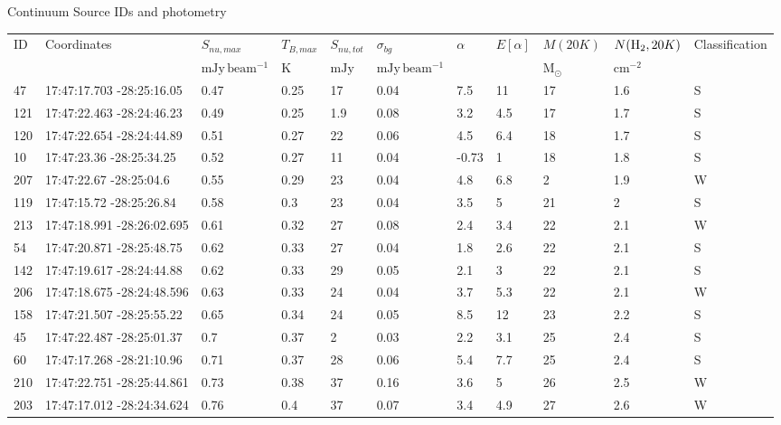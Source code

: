 \begin{deluxetable}[htp]
\caption{Continuum Source IDs and photometry}
\begin{tabular}{lllllllllll}
\label{tab:photometry}
\footnotesize
ID & Coordinates & $S_{nu,max}$ & $T_{B,max}$ & $S_{nu,tot}$ & $\sigma_{bg}$ & $\alpha$ & $E[\alpha]$ & $M(20 K)$ & $N(\textrm{H}_{2},20 K)$ & Classification \\
 &  & $\mathrm{mJy\,beam^{-1}}$ & $\mathrm{K}$ & $\mathrm{mJy}$ & $\mathrm{mJy\,beam^{-1}}$ &  &  & $\mathrm{M_{\odot}}$ & $\mathrm{cm^{-2}}$ &  \\
\hline
47 & 17:47:17.703 -28:25:16.05 & 0.47 & 0.25 & 17 & 0.04 & 7.5 & 11 & 17 & 1.6\ee{24} & S \\
121 & 17:47:22.463 -28:24:46.23 & 0.49 & 0.25 & 1.9 & 0.08 & 3.2 & 4.5 & 17 & 1.7\ee{24} & S \\
120 & 17:47:22.654 -28:24:44.89 & 0.51 & 0.27 & 22 & 0.06 & 4.5 & 6.4 & 18 & 1.7\ee{24} & S \\
10 & 17:47:23.36 -28:25:34.25 & 0.52 & 0.27 & 11 & 0.04 & -0.73 & 1 & 18 & 1.8\ee{24} & S \\
207 & 17:47:22.67 -28:25:04.6 & 0.55 & 0.29 & 23 & 0.04 & 4.8 & 6.8 & 2 & 1.9\ee{24} & W \\
119 & 17:47:15.72 -28:25:26.84 & 0.58 & 0.3 & 23 & 0.04 & 3.5 & 5 & 21 & 2\ee{24} & S \\
213 & 17:47:18.991 -28:26:02.695 & 0.61 & 0.32 & 27 & 0.08 & 2.4 & 3.4 & 22 & 2.1\ee{24} & W \\
54 & 17:47:20.871 -28:25:48.75 & 0.62 & 0.33 & 27 & 0.04 & 1.8 & 2.6 & 22 & 2.1\ee{24} & S \\
142 & 17:47:19.617 -28:24:44.88 & 0.62 & 0.33 & 29 & 0.05 & 2.1 & 3 & 22 & 2.1\ee{24} & S \\
206 & 17:47:18.675 -28:24:48.596 & 0.63 & 0.33 & 24 & 0.04 & 3.7 & 5.3 & 22 & 2.1\ee{24} & W \\
158 & 17:47:21.507 -28:25:55.22 & 0.65 & 0.34 & 24 & 0.05 & 8.5 & 12 & 23 & 2.2\ee{24} & S \\
45 & 17:47:22.487 -28:25:01.37 & 0.7 & 0.37 & 2 & 0.03 & 2.2 & 3.1 & 25 & 2.4\ee{24} & S \\
60 & 17:47:17.268 -28:21:10.96 & 0.71 & 0.37 & 28 & 0.06 & 5.4 & 7.7 & 25 & 2.4\ee{24} & S \\
210 & 17:47:22.751 -28:25:44.861 & 0.73 & 0.38 & 37 & 0.16 & 3.6 & 5 & 26 & 2.5\ee{24} & W \\
203 & 17:47:17.012 -28:24:34.624 & 0.76 & 0.4 & 37 & 0.07 & 3.4 & 4.9 & 27 & 2.6\ee{24} & W \\

\end{tabular}
\end{deluxetable}
